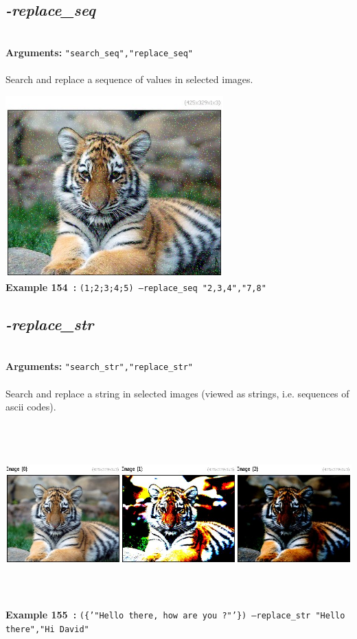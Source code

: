 \documentclass[a4paper,11pt,twoside]{book}
\begin{document}
\subsection{\emph{-replace\_seq} }\vspace*{-0.5em}
~\\\textbf{Arguments: } 
{\small \texttt{"search\_seq","replace\_seq"}}\\~\\
Search and replace a sequence of values in selected images.
\begin{center}\includegraphics[keepaspectratio=true,height=7cm,width=\textwidth]{img/gmic_def154.jpg}\\
{\footnotesize \textbf{Example 154~:} \texttt{(1;2;3;4;5) --replace\_seq "2,3,4","7,8"}}
\end{center}

\subsection{\emph{-replace\_str} }\vspace*{-0.5em}
~\\\textbf{Arguments: } 
{\small \texttt{"search\_str","replace\_str"}}\\~\\
Search and replace a string in selected images (viewed as strings, i.e. sequences of ascii codes).
\begin{center}\includegraphics[keepaspectratio=true,height=7cm,width=\textwidth]{img/gmic_def155.jpg}\\
{\footnotesize \textbf{Example 155~:} \texttt{(\{'"Hello there, how are you ?"'\}) --replace\_str "Hello there","Hi David"}}
\end{center}
\end{document}
